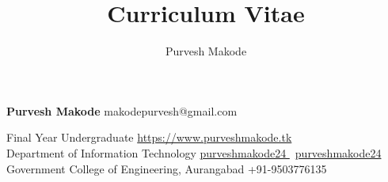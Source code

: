 \documentclass[9pt]{extarticle}
\title{Curriculum Vitae}
\author{Purvesh Makode}
\begin{document}

\begingroup
{}

{\Huge\textbf{\sc Purvesh Makode}}
\hfill
makodepurvesh@gmail.com \faEnvelope


Final Year Undergraduate
\hfill
\href{https://www.purveshmakode.tk}{https://www.purveshmakode.tk \faHome}\\

Department of Information Technology
\hfill
\href{https://github.com/purveshmakode24}{purveshmakode24 \faGithub} \textbar \ 
\href{https://www.linkedin.com/in/purveshmakode24/}{purveshmakode24 \faLinkedin} \\

Government College of Engineering, Aurangabad
\hfill
+91-9503776135 \faMobile \\
\vspace{6mm}

\begin{minipage}[t]{0.48\textwidth}
  \vspace{4mm}
  
  \vspace{3mm}  %
  
\end{minipage}
\hfill
\begin{minipage}[t]{0.48\textwidth}
  \vspace{4mm}
  
  \vspace{1mm}  %
  
%   
  \vspace{3mm}  %
  
  \vspace{3mm}  %
%   
  
\end{minipage}
\vspace{4mm}


\endgroup
\end{document}
